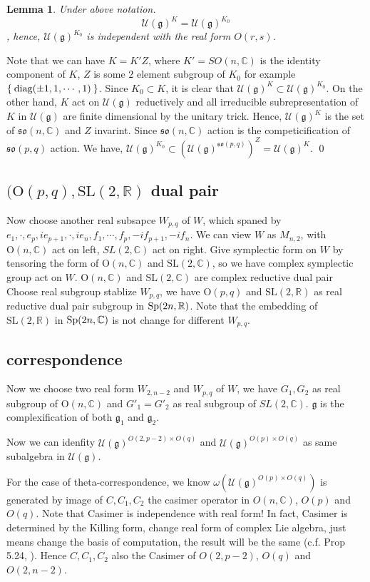 \documentclass[12pt]{article}
\newtheorem{lemma}{Lemma}
\def\bR{{\mathbb{R}}}
\def\bC{{\mathbb{C}}}
\def\Sp{{\rm Sp}}
\def\SL{{\rm SL}}
\def\aso{\mathfrak{so}}
\def\diag#1{\mathrm{diag}(#1)}
\def\fgg{\mathfrak{g}}
\def\cuu{\mathcal{U}}
\def\OO{\mathrm{O}}
\def\SL{\mathrm{SL}}
\begin{document}
\begin{lemma} Under above notation.
\[\cuu(\fgg)^{K} = \cuu(\fgg)^{K_0}\], 
hence, $\cuu(\fgg)^{K_0}$ is independent with the real form $O(r,s)$. 
\end{lemma}
\proof Note that we can have $K=K'Z$, where $K' = SO(n,\bC)$ is the identity component of
 $K$, $Z$ is some $2$ element subgroup of $K_0$ 
for example $\Set{\diag{\pm 1,1, \cdots, 1}}$. Since $K_0\subset K$, 
it is clear that $\cuu(\fgg)^K\subset \cuu(\fgg)^{K_0}$.
On the other hand, $K$ act on $\cuu(\fgg)$ reductively
and all irreducible subrepresentation of $K$ in $\cuu(\fgg)$ 
are finite dimensional by the unitary trick. Hence, 
$\cuu(\fgg)^K$ is the set of $\aso(n,\bC)$ and $Z$ invarint.
Since $\aso(n,\bC)$ action is the competicification of $\aso(p,q)$ action.
We have, $\cuu(\fgg)^{K_0} \subset (\cuu(\fgg)^{\aso(p,q)})^Z = \cuu(\fgg)^K$.
\qed



\subsection{$(\OO(p,q),\SL(2,\bR)$ dual pair}
Now choose another real subsapce $W_{p,q}$ of $W$, 
which spaned by $e_1,\cdot, e_p, ie_{p+1},\cdot,ie_{n}, 
f_1, \cdots, f_p, -if_{p+1}, -if_n$. We can view $W$ as $M_{n,2}$, 
with $\OO(n,\bC)$ act on left, $SL(2,\bC)$ act on right. 
Give symplectic form on $W$ by tensoring the form 
of $\OO(n,\bC)$ and $\SL(2,\bC)$, so we have complex symplectic group act on $W$.
$\OO(n,\bC)$ and $\SL(2,\bC)$ are complex reductive dual pair 
Choose real subgroup stablize $W_{p,q}$, we have $\OO(p,q)$ and $\SL(2,\bR)$ 
as real reductive dual pair subgroup in $\Sp(2n,\bR)$. 
Note that the embedding of $\SL(2,\bR)$ in $\Sp(2n,\bC)$ is not change for
different $W_{p,q}$.

\subsection{correspondence}
Now we choose two real form $W_{2,n-2}$ and $W_{p,q}$ of $W$, we have
$G_1, G_2$ as real subgroup of $\OO(n,\bC)$ and $G'_1=G'_2$ as real subgroup 
of $SL(2,\bC)$. $\fgg$ is the complexification of both $\fgg_1$ and $\fgg_2$. 

Now we can idenfity $\cuu(\fgg)^{O(2,p-2)\times O(q)}$ and
$\cuu(\fgg)^{O(p)\times O(q)}$ as same subalgebra in $\cuu(\fgg)$.

For the case of theta-correspondence, we know $\omega(\cuu(\fgg)^{O(p)\times O(q)})$
is generated by image of $C,C_1,C_2$ the casimer operator in $O(n,\bC)$,
$O(p)$ and $O(q)$. Note that Casimer is independence with real form!
In fact, Casimer is determined by the Killing form, change real form of complex
Lie algebra, just means change the basis of computation, the result will be 
the same (c.f. Prop 5.24, \cite{Knapp1996Lie}).
Hence $C, C_1, C_2$ also the Casimer of $O(2,p-2)$, $O(q)$ and $O(2,n-2)$.
\end{document}
